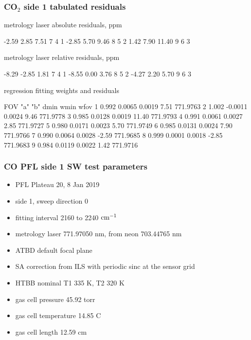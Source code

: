 \documentclass[10pt]{beamer}
\begin{document}
\begin{frame}[fragile]
\frametitle{CO$_2$ side 1 tabulated residuals}

  metrology laser absolute residuals, ppm
\begin{semiverbatim}\scriptsize
     -2.59     2.85     7.51         7   4   1
     -2.85     5.70     9.46         8   5   2
      1.42     7.90    11.40         9   6   3
\end{semiverbatim}

  metrology laser relative residuals, ppm
\begin{semiverbatim}\scriptsize
     -8.29    -2.85     1.81         7   4   1
     -8.55     0.00     3.76         8   5   2
     -4.27     2.20     5.70         9   6   3
\end{semiverbatim}

     regression fitting weights and residuals
\begin{semiverbatim}\scriptsize
 FOV   "a"       "b"     dmin     wmin      wfov
  1   0.992    0.0065   0.0019     7.51   771.9763 
  2   1.002   -0.0011   0.0024     9.46   771.9778 
  3   0.985    0.0128   0.0019    11.40   771.9793 
  4   0.991    0.0061   0.0027     2.85   771.9727 
  5   0.980    0.0171   0.0023     5.70   771.9749 
  6   0.985    0.0131   0.0024     7.90   771.9766 
  7   0.990    0.0064   0.0028    -2.59   771.9685 
  8   0.999    0.0001   0.0018    -2.85   771.9683 
  9   0.984    0.0119   0.0022     1.42   771.9716 
\end{semiverbatim}

\end{frame}
\begin{frame}
\frametitle{CO PFL side 1 SW test parameters}

\begin{itemize}
  \item PFL Plateau 20, 8 Jan 2019
  \item side 1, sweep direction 0
  \item fitting interval 2160 to 2240 $\mbox{cm$^{-1}$}$
  \item metrology laser 771.97050 nm, from neon 703.44765 nm
  \item ATBD default focal plane
  \item SA correction from ILS with periodic sinc at the sensor grid
  \item HTBB nominal T1 335 K, T2 320 K
  \item gas cell pressure 45.92 torr
  \item gas cell temperature 14.85 C
  \item gas cell length 12.59 cm
\end{itemize}

\end{frame}
\end{document}
